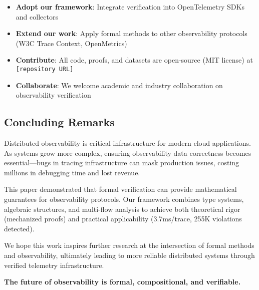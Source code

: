 \begin{itemize}
\item \textbf{Adopt our framework}: Integrate verification into OpenTelemetry SDKs and collectors
\item \textbf{Extend our work}: Apply formal methods to other observability protocols (W3C Trace Context, OpenMetrics)
\item \textbf{Contribute}: All code, proofs, and datasets are open-source (MIT license) at \texttt{[repository URL]}
\item \textbf{Collaborate}: We welcome academic and industry collaboration on observability verification
\end{itemize}

\subsection{Concluding Remarks}
\label{sec:concluding}

Distributed observability is critical infrastructure for modern cloud applications. As systems grow more complex, ensuring observability data correctness becomes essential—bugs in tracing infrastructure can mask production issues, costing millions in debugging time and lost revenue.

This paper demonstrated that formal verification can provide mathematical guarantees for observability protocols. Our framework combines type systems, algebraic structures, and multi-flow analysis to achieve both theoretical rigor (mechanized proofs) and practical applicability (3.7ms/trace, 255K violations detected).

We hope this work inspires further research at the intersection of formal methods and observability, ultimately leading to more reliable distributed systems through verified telemetry infrastructure.

\textbf{The future of observability is formal, compositional, and verifiable.}
